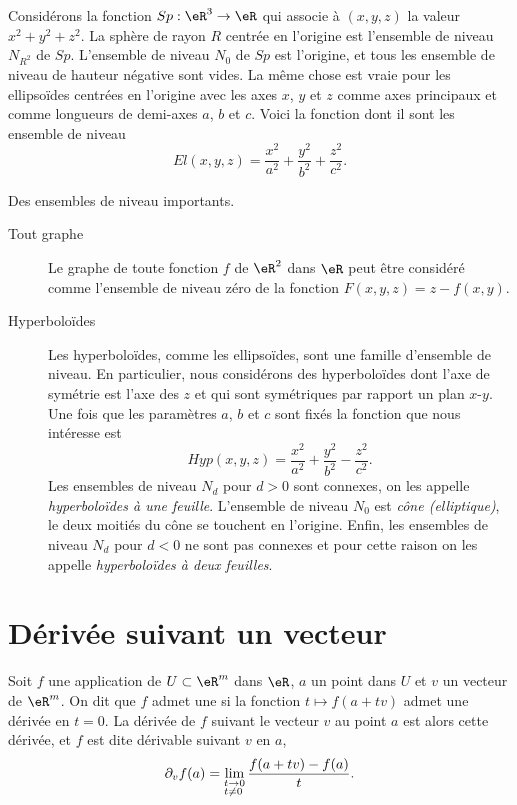 Considérons la fonction $Sp: \eR^3\to \eR$ qui associe à $(x,y,z)$ la valeur $x^2+y^2+z^2$. La sphère de rayon $R$ centrée en l'origine est l'ensemble de niveau $N_{R^2}$ de $Sp$. L'ensemble de niveau $N_{0}$ de $Sp$ est l'origine, et tous les ensemble de niveau de hauteur négative sont vides. La même chose est vraie pour les ellipsoïdes centrées en l'origine avec les axes $x$, $y$ et $z$ comme axes principaux et comme longueurs de demi-axes $a$, $b$ et $c$. Voici la fonction dont il sont les ensemble de niveau 
\[
El(x,y,z)= \frac{x^2}{a^2}+\frac{y^2}{b^2}+\frac{z^2}{c^2}.
\] 
\begin{example}
	Des ensembles de niveau importants.
  \begin{description}
    \item[Tout graphe] 
	    Le graphe de toute fonction $f$  de $\eR^2$ dans $\eR$ peut être considéré comme l'ensemble de niveau zéro de la fonction $F(x,y,z)=z-f(x,y)$.

    \item[Hyperboloïdes]
	    Les hyperboloïdes, comme les ellipsoïdes, sont une famille d'ensemble de niveau. En particulier, nous considérons des hyperboloïdes dont l'axe de symétrie est l'axe des $z$ et qui sont symétriques par rapport un plan $x$-$y$.  Une fois que les paramètres  $a$, $b$ et $c$ sont fixés la fonction que nous intéresse est 
\[
Hyp(x,y,z)= \frac{x^2}{a^2}+\frac{y^2}{b^2}-\frac{z^2}{c^2}.
\]
Les ensembles de niveau $N_d$ pour $d>0$ sont connexes, on les appelle \emph{hyperboloïdes à une feuille}. L'ensemble de niveau $N_0$ est \emph{cône (elliptique)}, le deux moitiés du cône se touchent en l'origine. Enfin, les ensembles de niveau $N_d$ pour $d<0$ ne sont  pas connexes et pour cette raison on les appelle \emph{hyperboloïdes à deux feuilles}.
  \end{description}
\end{example}


\section{Dérivée suivant un vecteur}		\label{SecDerDirect}
\begin{definition}
Soit $f$ une application de $U\subset\eR^m$ dans $\eR$, $a$ un point dans $U$ et $v$ un vecteur de $\eR^m$. On dit que $f$ admet une  si la fonction $t\mapsto f(a+tv)$ admet une dérivée en $t=0$. La  dérivée de $f$ suivant le vecteur $v$ au point $a$ est alors cette dérivée, et $f$ est dite dérivable suivant $v$ en $a$,
\[
\partial_v f(a)=\lim_{
  \begin{subarray}{l}
    t\to 0\\ t\neq 0 
  \end{subarray}
 }\frac{f(a+tv)-f(a)}{t}.
\] 
\end{definition}

